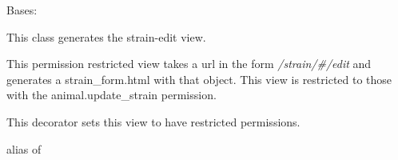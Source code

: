 \documentclass[letterpaper,10pt,english]{sphinxmanual}
\begin{document}

\begin{fulllineitems}
\label{api:mousedb.animal.views.StrainUpdate}
Bases: \href{http://docs.djangoproject.com/en/dev/ref/class-based-views/\#django.views.generic.edit.UpdateView}{}

This class generates the strain-edit view.

This permission restricted view takes a url in the form \emph{/strain/\#/edit} and generates a strain\_form.html with that object.
This view is restricted to those with the animal.update\_strain permission.

\begin{fulllineitems}
\label{api:mousedb.animal.views.StrainUpdate.context_object_name}
\end{fulllineitems}


\begin{fulllineitems}
\label{api:mousedb.animal.views.StrainUpdate.dispatch}
This decorator sets this view to have restricted permissions.

\end{fulllineitems}


\begin{fulllineitems}
\label{api:mousedb.animal.views.StrainUpdate.model}
alias of 

\end{fulllineitems}


\begin{fulllineitems}
\label{api:mousedb.animal.views.StrainUpdate.template_name}
\end{fulllineitems}


\end{fulllineitems}
\end{document}
